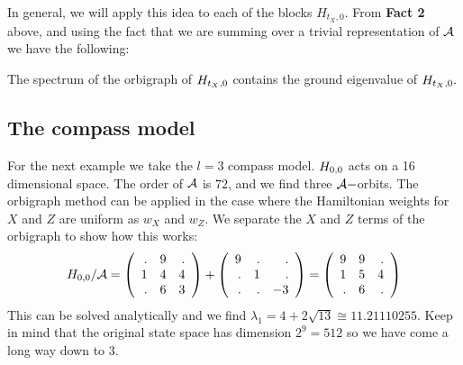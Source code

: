 \documentclass[12pt]{article}
\renewenvironment{framed}
{\begin{samepage}
\MakeFramed{\hsize0.8\linewidth\advance\hsize-\width\FrameRestore}}
{\endMakeFramed\end{samepage}}
\begin{document}
In general, we will apply this idea to each of the blocks $H_{t_X,0}$.
From {\bf Fact 2} above, and using the fact that we are
summing over a trivial representation of $\mathcal{A}$ we have the following:
\begin{framed}
The spectrum of the orbigraph of $H_{t_X,0}$ contains the ground eigenvalue of $H_{t_X,0}.$
\end{framed}

%
\subsection{The compass model}
For the next example we take the $l=3$ compass model.
$H_{0,0}$ acts on a 16 dimensional space.
The order of $\mathcal{A}$ is $72$, and we find three $\mathcal{A}-$orbits.
The orbigraph method can be applied in the case
where the Hamiltonian weights for $X$ and $Z$ are uniform as $w_X$ and $w_Z.$
We separate the $X$ and $Z$ terms of the orbigraph to show
how this works:
$$
H_{0,0}/\mathcal{A} = 
\left(\begin{array}{rrr}
 . &  9 &  . \cr
  1 &  4 &  4 \cr
  . &  6 &  3
\end{array}\right) + 
\left(\begin{array}{rrr}
 9 &  . &  . \cr
  . &  1 &  . \cr
  . &  . &  -3
\end{array}\right)
=
\left(\begin{array}{rrr}
 9 &  9 &  . \cr
  1 &  5 &  4 \cr
  . &  6 &  .
\end{array}\right)
$$
This can be solved analytically and we find $\lambda_1 = 4+2\sqrt{13} \cong 11.21110255.$
Keep in mind that the original state space has dimension $2^9=512$ so we
have come a long way down to 3.
\end{document}
